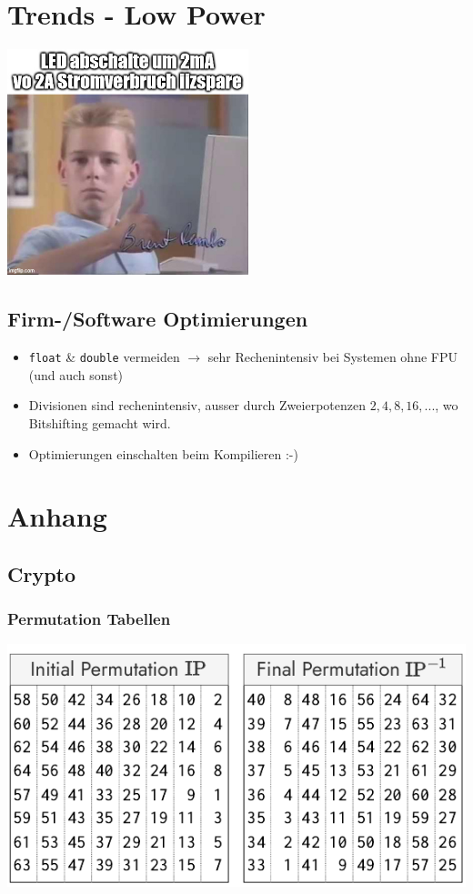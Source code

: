 \documentclass[
  10pt,
  a4paper,
  twocolumn]{article}
\providecommand{\tightlist}{%
  \setlength{\itemsep}{0pt}\setlength{\parskip}{0pt}}\usepackage{longtable,booktabs,array}
\begin{document}
\newpage

\section{Trends - Low Power}\label{trends---low-power}

\begin{center}
\includegraphics[width=7cm,height=\textheight]{images/trends_meme.jpg}
\end{center}

\subsection{Firm-/Software
Optimierungen}\label{firm-software-optimierungen}

\begin{itemize}
\tightlist
\item
  \texttt{float} \& \texttt{double} vermeiden \(\rightarrow\) sehr
  Rechenintensiv bei Systemen ohne FPU (und auch sonst)
\item
  Divisionen sind rechenintensiv, ausser durch Zweierpotenzen
  \(2,4,8,16,...\), wo Bitshifting gemacht wird.
\item
  Optimierungen einschalten beim Kompilieren :-)
\end{itemize}

\newpage

\section{Anhang}\label{anhang}

\subsection{Crypto}\label{crypto-1}

\subsubsection{Permutation Tabellen}\label{permutation-tabellen}

\begin{center}
\includegraphics{images/crypto/permutation tables.pdf}
\end{center}
\end{document}
